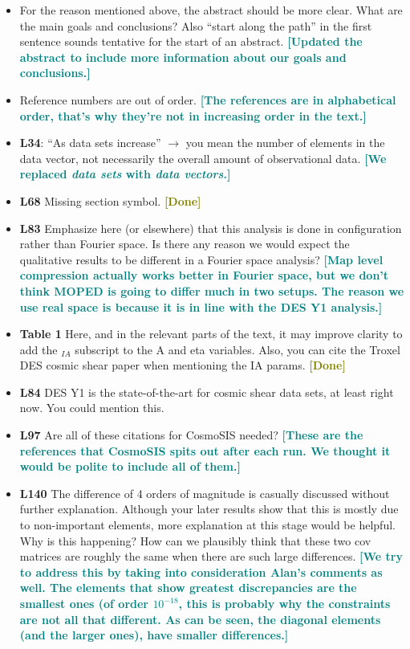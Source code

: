\documentclass{article}
\newcommand\reply[1]{{\bf {\textcolor{teal}{[#1]}}}}
\newcommand\done{{\bf {\textcolor{olive}{[Done]}}}}
\begin{document}
	\begin{itemize}
		\item For the reason mentioned above, the abstract should be more clear. What are the main goals and conclusions? Also “start along the path” in the first sentence sounds tentative for the start of an abstract. \reply{Updated the abstract to include more information about our goals and conclusions.}
		\item Reference numbers are out of order. \reply{The references are in alphabetical order, that's why they're not in increasing order in the text.}
		\item \textbf{L34}: “As data sets increase” $\rightarrow$ you mean the number of elements in the data vector, not necessarily the overall amount of observational data. \reply{We replaced \textit{data sets} with \textit{data vectors}.}
		\item \textbf{L68} Missing section symbol. \done
		\item \textbf{L83} Emphasize here (or elsewhere) that this analysis is done in configuration rather than Fourier space. Is there any reason we would expect the qualitative results to be different in a Fourier space analysis? \reply{Map level compression actually works better in Fourier space, but we don't think MOPED is going to differ much in two setups. The reason we use real space is because it is in line with the DES Y1 analysis.}
		\item \textbf{Table 1} Here, and in the relevant parts of the text, it may improve clarity to add the $_{IA}$ subscript to the A and eta variables. Also, you can cite the Troxel DES cosmic shear paper when mentioning the IA params. \done
		\item \textbf{L84} DES Y1 is the state-of-the-art for cosmic shear data sets, at least right now. You could mention this.
		\item \textbf{L97} Are all of these citations for CosmoSIS needed? \reply{These are the references that CosmoSIS spits out after each run. We thought it would be polite to include all of them.}
		\item \textbf{L140} The difference of 4 orders of magnitude is casually discussed without further explanation. Although your later results show that this is mostly due to non-important elements, more explanation at this stage would be helpful. Why is this happening? How can we plausibly think that these two cov matrices are roughly the same when there are such large differences. \reply{We try to address this by taking into consideration Alan's comments as well. The elements that show greatest discrepancies are the smallest ones (of order $10^{-18}$, this is probably why the constraints are not all that different. As can be seen, the diagonal elements (and the larger ones), have smaller differences.}

\end{itemize}
\end{document}

